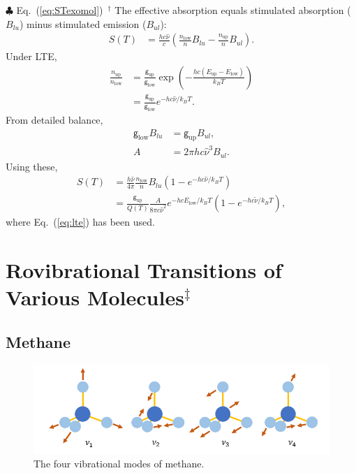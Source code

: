 \begin{itembox}{$\clubsuit$ Eq.~(\ref{eq:STexomol}) $\,^\dagger$}
\footnotesize
The effective absorption equals stimulated absorption ($B_{lu}$) minus stimulated emission ($B_{ul}$):
\begin{align}
S(T) &= \frac{h c \hat{\nu}}{c} \left( \frac{n_\mathrm{low}}{n} B_{lu} - \frac{n_\mathrm{up}}{n} B_{ul} \right).
\end{align}
Under LTE,
\begin{align}
\frac{n_\mathrm{up}}{n_\mathrm{low}} &= \frac{\mathsf{g}_\mathrm{up}}{\mathsf{g}_\mathrm{low}}
\exp\!\left(- \frac{h c (E_\mathrm{up} - E_\mathrm{low})}{k_B T} \right) \\
&= \frac{\mathsf{g}_\mathrm{up}}{\mathsf{g}_\mathrm{low}} e^{-hc \hat{\nu}/k_B T}.
\end{align}
From detailed balance,
\begin{align}
\mathsf{g}_\mathrm{low} B_{lu} &= \mathsf{g}_\mathrm{up} B_{ul}, \\
A &= 2 \pi h c \hat{\nu}^3 B_{ul}.
\end{align}
Using these,
\begin{align}
S(T) &= \frac{h \hat{\nu}}{4 \pi} \frac{n_\mathrm{low}}{n} B_{lu} \left(1 -  e^{-hc \hat{\nu}/k_B T}\right) \\
&= \frac{\mathsf{g}_\mathrm{up}}{Q(T)} \frac{ A}{8 \pi c \hat{\nu}^2}
e^{- h c E_\mathrm{low}/k_B T} \left(1- e^{- h c \tilde{\nu}/k_B T}\right),
\end{align}
where Eq.~(\ref{eq:lte}) has been used.
\end{itembox}

\section{Rovibrational Transitions of Various Molecules$^\ddagger$}

\subsection*{Methane}
\begin{figure}
    \centering
    \includegraphics[width=\linewidth]{fig/methanevib.png}
    \caption{The four vibrational modes of methane.}
    \label{fig:ch4vib}
\end{figure}


